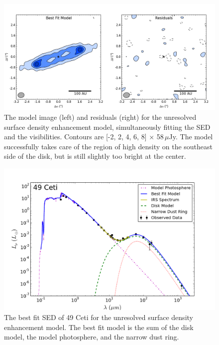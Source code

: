 \begin{figure}%
\label{fig:49CET_BonusBeltSED_SED}
\centering
\includegraphics[width = 1\textwidth]{49CET_BonusBeltSED_ModelResidual.png}
\caption{The model image (left) and residuals (right) for the unresolved surface density enhancement model, simultaneously fitting the SED and the visibilities. Contours are [-2, 2, 4, 6, 8] $\times$ 58$\,\mu$Jy. The model successfully takes care of the region of high density on the southeast side of the disk, but is still slightly too bright at the center.}
\label{fig:49CET_BonusBeltSED_ModelResidual}
\end{figure}

\begin{figure}%
\centering
\includegraphics[width = 1\textwidth]{49CET_BonusBeltSED_SED.png}
\caption{The best fit SED of 49 Ceti for the unresolved surface density enhancement model. The best fit model is the sum of the disk model, the model photosphere, and the narrow dust ring.}
\label{fig:49CET_BonusBeltSED_SED}
\end{figure}

